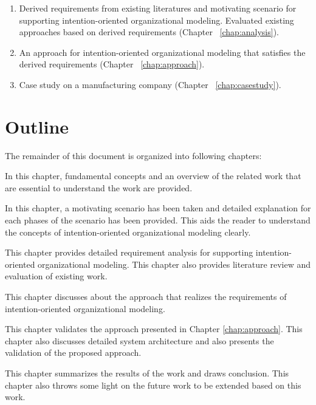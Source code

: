 \begin{enumerate}
 	\item Derived requirements from existing literatures and motivating scenario for supporting intention-oriented organizational modeling. Evaluated existing approaches based on derived requirements (Chapter  ~\ref{chap:analysis}).
 	\item An approach for intention-oriented organizational modeling that satisfies the derived requirements (Chapter ~\ref{chap:approach}).
 	\item Case study on a manufacturing company (Chapter ~\ref{chap:casestudy}).
\end{enumerate}
 
\section{Outline}
\label{sec:outline}
The remainder of this document is organized into following chapters:

\begin{description} [labelwidth = 0.07\textwidth]
	\item[Chapter ~\ref{chap:fundamentals} -- \nameref{chap:fundamentals}:] In this chapter, fundamental concepts and an overview of the related work that are essential to understand the work are provided.
	\item[Chapter ~\ref{chap:motivatingScenario} -- \nameref{chap:motivatingScenario}:] In this chapter, a motivating scenario has been taken and detailed explanation for each phases of the scenario has been provided. This aids the reader to understand the concepts of intention-oriented organizational modeling clearly. 
	\item [Chapter ~\ref{chap:analysis} --\textbf{Requirements for Supporting Intention-oriented Organizational Modeling}:] This chapter provides detailed requirement analysis for supporting intention-oriented organizational modeling. This chapter also provides literature review and evaluation of existing work.
	\item[Chapter ~\ref{chap:approach} -- \nameref{chap:approach}:] This chapter discusses about the approach that realizes the requirements  of intention-oriented organizational modeling.
	\item[Chapter ~\ref{chap:casestudy} -- \nameref{chap:casestudy}:] This chapter validates the approach presented in Chapter \ref{chap:approach}. This chapter also discusses detailed system architecture and also presents the validation of the proposed approach. 	
	\item[Chapter ~\ref{chap:conclusion} -- \nameref{chap:conclusion}:] This chapter summarizes the results of the work and draws conclusion. This chapter also throws some light on the future work to be extended based on this work. 
\end{description}